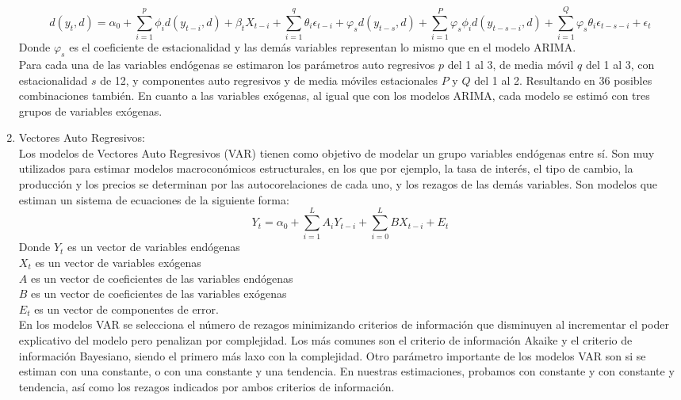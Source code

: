 \documentclass[a4paper, 11pt]{article}
\begin{document}
\begin{enumerate}
\begin{equation}
d(y_{t}, d) = \alpha_{0} + \sum_{i = 1}^{p}{\phi_{i}d(y_{t-i}, d) + \beta_{t}X_{t-i}} + \sum_{i = 1}^{q}{\theta_{i}\epsilon_{t-i}} + \varphi_{s}d(y_{t-s}, d) + \sum_{i = 1}^{P}{ \varphi_{s}\phi_{i}d(y_{t-s-i}, d)}+ \sum_{i = 1}^{Q}{ \varphi_{s}\theta_{i}\epsilon_{t-s-i}}+\epsilon_{t}
\end{equation}
Donde $\varphi_{s}$ es el coeficiente de estacionalidad y las demás variables representan lo mismo que en el modelo ARIMA.\\
Para cada una de las variables endógenas se estimaron los parámetros auto regresivos $p$ del 1 al 3, de media móvil $q$ del 1 al 3, con estacionalidad $s$ de 12, y componentes auto regresivos y de media móviles estacionales  $P$ y $Q$ del 1 al 2. Resultando en 36 posibles combinaciones también. En cuanto a las variables exógenas, al igual que con los modelos ARIMA, cada modelo se estimó con tres grupos de variables exógenas.

\item Vectores Auto Regresivos: \\
Los modelos de Vectores Auto Regresivos (VAR) tienen como objetivo de modelar un grupo variables endógenas entre sí. Son muy utilizados para estimar modelos macroconómicos estructurales, en los que por ejemplo, la tasa de interés, el tipo de cambio, la producción y los precios se determinan por las autocorelaciones de cada uno, y los rezagos de las demás variables. Son modelos que estiman un sistema de ecuaciones de la siguiente forma:
\begin{equation}
Y_{t} = \alpha_{0} + \sum_{i=1}^{L}{A_{i}Y_{t-i}} + \sum_{i=0}^{L}B X_{t-i} +E_{t}
\end{equation}
Donde $Y_t $ es un vector de variables endógenas\\
$X_{t}$ es un vector de variables exógenas\\
$A$ es un vector de coeficientes de las variables endógenas\\
$B$ es un vector de coeficientes de las variables exógenas\\
 $E_{t}$ es un vector de componentes de error.\\
 En los modelos VAR se selecciona el número de rezagos minimizando criterios de información que disminuyen al incrementar el poder explicativo del modelo pero penalizan por complejidad. Los más comunes son el criterio de información Akaike y el criterio de información Bayesiano, siendo el primero más laxo con la complejidad. Otro parámetro importante de los modelos VAR son si se estiman con una constante, o con una constante y una tendencia. En nuestras estimaciones, probamos con constante y con constante y tendencia, así como los rezagos indicados por ambos criterios de información. 


\end{enumerate}
\end{document}
